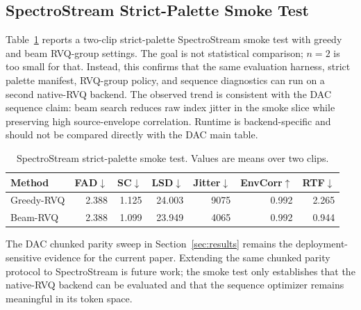 \documentclass[twoside,a4paper]{article}
\begin{document}
\subsection{SpectroStream Strict-Palette Smoke Test}

Table~\ref{tab:port-spectro-smoke} reports a two-clip strict-palette SpectroStream smoke test with greedy and beam RVQ-group settings. The goal is not statistical comparison; $n=2$ is too small for that. Instead, this confirms that the same evaluation harness, strict palette manifest, RVQ-group policy, and sequence diagnostics can run on a second native-RVQ backend. The observed trend is consistent with the DAC sequence claim: beam search reduces raw index jitter in the smoke slice while preserving high source-envelope correlation. Runtime is backend-specific and should not be compared directly with the DAC main table.

\begin{table}[!t]
    \centering
    \scriptsize
    \setlength{\tabcolsep}{2.2pt}
    \caption{SpectroStream strict-palette smoke test. Values are means over two clips.}
    \label{tab:port-spectro-smoke}
    \begin{tabular}{lrrrrrr}
    \toprule
    Method & FAD$\downarrow$ & SC$\downarrow$ & LSD$\downarrow$ & Jitter$\downarrow$ & EnvCorr$\uparrow$ & RTF$\downarrow$ \\
    \midrule
    Greedy-RVQ & 2.388 & 1.125 & 24.003 & 9075 & 0.992 & 2.265 \\
    Beam-RVQ & 2.388 & 1.099 & 23.949 & 4065 & 0.992 & 0.944 \\
    \bottomrule
    \end{tabular}
\end{table}

The DAC chunked parity sweep in Section~\ref{sec:results} remains the deployment-sensitive evidence for the current paper. Extending the same chunked parity protocol to SpectroStream is future work; the smoke test only establishes that the native-RVQ backend can be evaluated and that the sequence optimizer remains meaningful in its token space.
\end{document}
